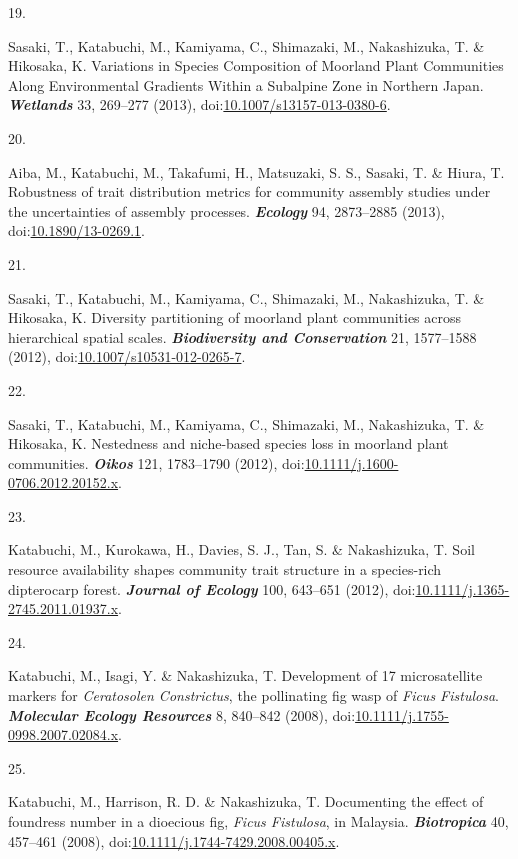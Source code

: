 \documentclass[
]{article}
\newlength{\cslhangindent}
\newlength{\csllabelwidth}
\newlength{\cslentryspacingunit} %
\newenvironment{CSLReferences}[2] %
 {%
  \setlength{\parindent}{0pt}
  \ifodd #1
  \let\oldpar\par
  \def\par{\hangindent=\cslhangindent\oldpar}
  \fi
  \setlength{\parskip}{#2\cslentryspacingunit}
 }%
 {}
\newcommand{\CSLLeftMargin}[1]{\parbox[t]{\csllabelwidth}{#1}}
\newcommand{\CSLRightInline}[1]{\parbox[t]{\linewidth - \csllabelwidth}{#1}\break}
\begin{document}
\begin{CSLReferences}{0}{0}
\leavevmode{}%
\CSLLeftMargin{19. }
\CSLRightInline{Sasaki, T., Katabuchi, M., Kamiyama, C., Shimazaki, M.,
Nakashizuka, T. \& Hikosaka, K. {Variations in Species Composition of
Moorland Plant Communities Along Environmental Gradients Within a
Subalpine Zone in Northern Japan}. \textbf{\emph{Wetlands}} 33, 269--277
(2013),
doi:\href{https://doi.org/10.1007/s13157-013-0380-6}{10.1007/s13157-013-0380-6}.}

\leavevmode{}%
\CSLLeftMargin{20. }
\CSLRightInline{Aiba, M., Katabuchi, M., Takafumi, H., Matsuzaki, S. S.,
Sasaki, T. \& Hiura, T. Robustness of trait distribution metrics for
community assembly studies under the uncertainties of assembly
processes. \textbf{\emph{Ecology}} 94, 2873--2885 (2013),
doi:\href{https://doi.org/10.1890/13-0269.1}{10.1890/13-0269.1}.}

\leavevmode{}%
\CSLLeftMargin{21. }
\CSLRightInline{Sasaki, T., Katabuchi, M., Kamiyama, C., Shimazaki, M.,
Nakashizuka, T. \& Hikosaka, K. Diversity partitioning of moorland plant
communities across hierarchical spatial scales.
\textbf{\emph{Biodiversity and Conservation}} 21, 1577--1588 (2012),
doi:\href{https://doi.org/10.1007/s10531-012-0265-7}{10.1007/s10531-012-0265-7}.}

\leavevmode{}%
\CSLLeftMargin{22. }
\CSLRightInline{Sasaki, T., Katabuchi, M., Kamiyama, C., Shimazaki, M.,
Nakashizuka, T. \& Hikosaka, K. Nestedness and niche-based species loss
in moorland plant communities. \textbf{\emph{Oikos}} 121, 1783--1790
(2012),
doi:\href{https://doi.org/10.1111/j.1600-0706.2012.20152.x}{10.1111/j.1600-0706.2012.20152.x}.}

\leavevmode{}%
\CSLLeftMargin{23. }
\CSLRightInline{Katabuchi, M., Kurokawa, H., Davies, S. J., Tan, S. \&
Nakashizuka, T. Soil resource availability shapes community trait
structure in a species-rich dipterocarp forest. \textbf{\emph{Journal of
Ecology}} 100, 643--651 (2012),
doi:\href{https://doi.org/10.1111/j.1365-2745.2011.01937.x}{10.1111/j.1365-2745.2011.01937.x}.}

\leavevmode{}%
\CSLLeftMargin{24. }
\CSLRightInline{Katabuchi, M., Isagi, Y. \& Nakashizuka, T. Development
of 17 microsatellite markers for {\emph{Ceratosolen Constrictus}}, the
pollinating fig wasp of {\emph{Ficus Fistulosa}}.
\textbf{\emph{Molecular Ecology Resources}} 8, 840--842 (2008),
doi:\href{https://doi.org/10.1111/j.1755-0998.2007.02084.x}{10.1111/j.1755-0998.2007.02084.x}.}

\leavevmode{}%
\CSLLeftMargin{25. }
\CSLRightInline{Katabuchi, M., Harrison, R. D. \& Nakashizuka, T.
Documenting the effect of foundress number in a dioecious fig,
{\emph{Ficus Fistulosa}}, in {Malaysia}. \textbf{\emph{Biotropica}} 40,
457--461 (2008),
doi:\href{https://doi.org/10.1111/j.1744-7429.2008.00405.x}{10.1111/j.1744-7429.2008.00405.x}.}

\end{CSLReferences}
\end{document}
